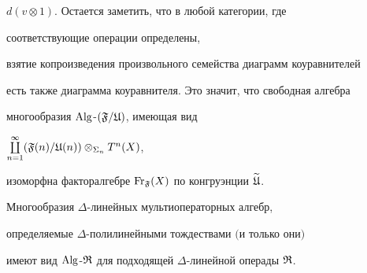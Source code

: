 \begin{pf}
$d (v\otimes 1)$. Остается заметить, что в любой категории, где


соответствующие операции определены,


взятие копроизведения произвольного семейства диаграмм коуравнителей


есть также диаграмма коуравнителя. Это значит, что свободная алгебра


многообразия $\operatorname{Alg}$-$(\frak F/\frak U)$, имеющая вид


$\coprod\limits_{n=1}^{\infty} (\frak F(n)/\frak U(n))\otimes_{\Sigma_n} T^n(X)$,


изоморфна факторалгебре $\operatorname{Fr}_{\frak F}(X)$ по конгруэнции $\widetilde{\frak U}$.


\end{pf}








\begin{thm}


Многообразия $\Delta$-линейных мультиоператорных алгебр,


определяемые $\Delta$-поли\-ли\-ней\-ными тождествами $($и только они$)$


имеют вид $\operatorname{Alg}$-$\frak R$ для подходящей $\Delta$-линейной операды $\frak R$.


\end{thm}





